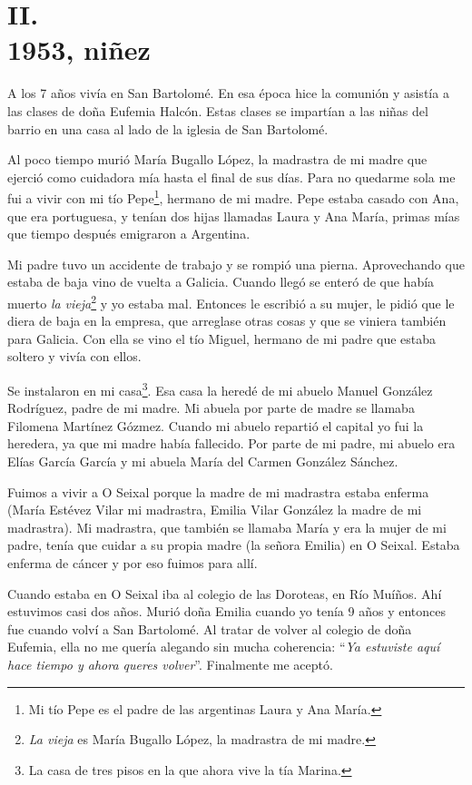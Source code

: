 \documentclass[12pt,a5paper]{book}
\begin{document}
\section*{II.\\1953, niñez}

A los 7 años vivía en San Bartolomé. En esa época hice la comunión y asistía a las clases de doña Eufemia Halcón. Estas clases se impartían a las niñas del barrio en una casa al lado de la iglesia de San Bartolomé.

Al poco tiempo murió María Bugallo López, la madrastra de mi madre que ejerció como cuidadora mía hasta el final de sus días. Para no quedarme sola me fui a vivir con mi tío Pepe\footnote{Mi tío Pepe es el padre de las argentinas Laura y Ana María.}, hermano de mi madre. Pepe estaba casado con Ana, que era portuguesa, y tenían dos hijas llamadas Laura y Ana María, primas mías que tiempo después emigraron a Argentina. 

Mi padre tuvo un accidente de trabajo y se rompió una pierna. Aprovechando que estaba de baja vino de vuelta a Galicia. Cuando llegó se enteró de que había muerto \textit{la vieja}\footnote{\textit{La vieja} es María Bugallo López, la madrastra de mi madre.} y yo estaba mal. Entonces le escribió a su mujer, le pidió que le diera de baja en la empresa, que arreglase otras cosas y que se viniera también para Galicia. Con ella se vino el tío Miguel, hermano de mi padre que estaba soltero y vivía con ellos.

Se instalaron en mi casa\footnote{La casa de tres pisos en la que ahora vive la tía Marina.}. Esa casa la heredé de mi abuelo Manuel González Rodríguez, padre de mi madre. Mi abuela por parte de madre se llamaba Filomena Martínez Gózmez. Cuando mi abuelo repartió el capital yo fui la heredera, ya que mi madre había fallecido. Por parte de mi padre, mi abuelo era Elías García García y mi abuela María del Carmen González Sánchez.

Fuimos a vivir a O Seixal porque la madre de mi madrastra estaba enferma (María Estévez Vilar mi madrastra, Emilia Vilar González la madre de mi madrastra). Mi madrastra, que también se llamaba María y era la mujer de mi padre, tenía que cuidar a su propia madre (la señora Emilia) en O Seixal. Estaba enferma de cáncer y por eso fuimos para allí.

Cuando estaba en O Seixal iba al colegio de las Doroteas, en Río Muíños. Ahí estuvimos casi dos años. Murió doña Emilia cuando yo tenía 9 años y entonces fue cuando volví a San Bartolomé. Al tratar de volver al colegio de doña Eufemia, ella no me quería alegando sin mucha coherencia: ``\textit{Ya estuviste aquí hace tiempo y ahora queres volver}''. Finalmente me aceptó.
\end{document}
